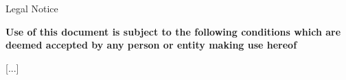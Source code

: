 Legal Notice

\textbf{Use of this document is subject to the following conditions which are deemed accepted by any person or entity making
use hereof}

[...]
